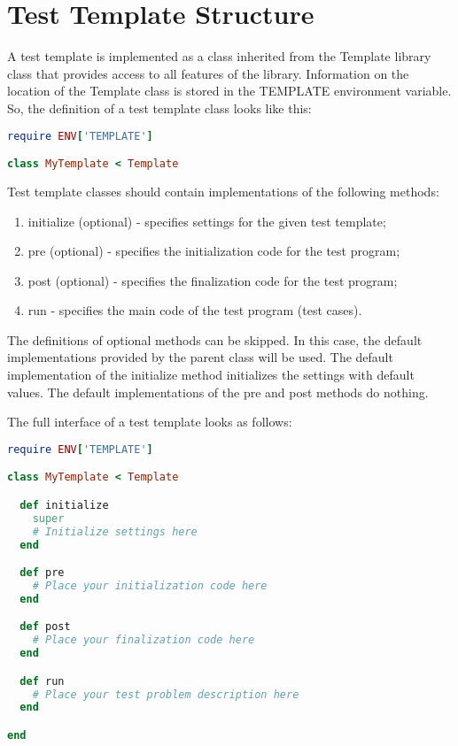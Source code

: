 \documentclass[oneside,final,14pt]{extreport}
\begin{document}
\section{Test Template Structure}

A test template is implemented as a class inherited from the Template library class
that provides access to all features of the library. Information on the location of
the Template class is stored in the TEMPLATE environment variable. So, the definition
of a test template class looks like this:

\begin{lstlisting}[language=ruby]
require ENV['TEMPLATE']

class MyTemplate < Template
\end{lstlisting}

Test template classes should contain implementations of the following methods:

\begin{enumerate}
  \item initialize (optional) - specifies settings for the given test template;
  \item pre (optional) - specifies the initialization code for the test program;
  \item post (optional) - specifies the finalization code for the test program;
  \item run - specifies the main code of the test program (test cases).
\end{enumerate}

The definitions of optional methods can be skipped. In this case, the default
implementations provided by the parent class will be used. The default implementation
of the initialize method initializes the settings with default values. The default
implementations of the pre and post methods do nothing.

The full interface of a test template looks as follows:

\begin{lstlisting}[language=ruby]
require ENV['TEMPLATE']

class MyTemplate < Template

  def initialize
    super
    # Initialize settings here 
  end

  def pre
    # Place your initialization code here
  end

  def post
    # Place your finalization code here
  end

  def run
    # Place your test problem description here
  end

end
\end{lstlisting}
\end{document}
